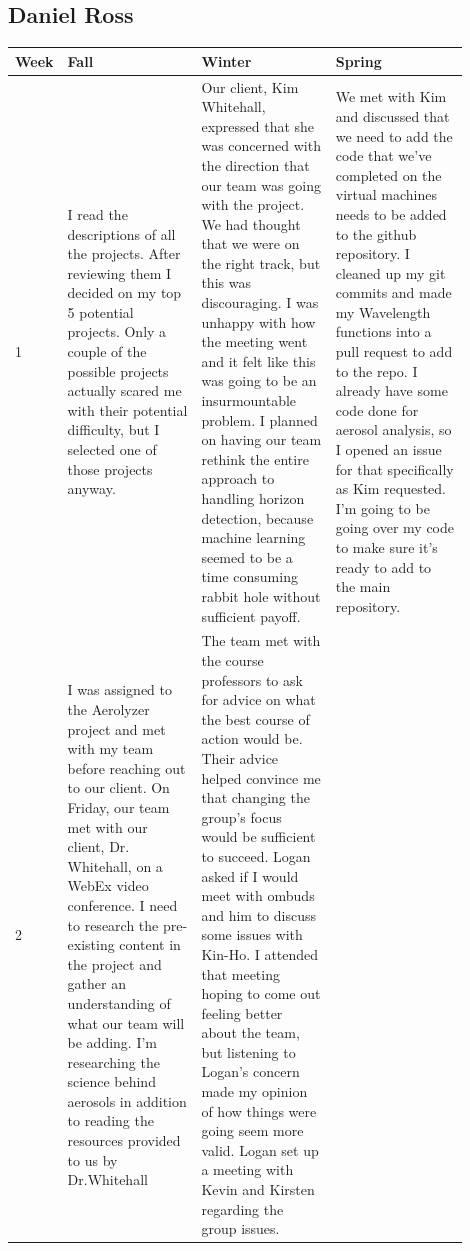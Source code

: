 \documentclass[onecolumn, draftclsnofoot,10pt, compsoc]{IEEEtran}
\begin{document}
\begin{singlespace}
		\subsection{Daniel Ross}
			\begin{longtable}{|l|p{0.3\linewidth}|p{0.3\linewidth}|p{0.3\linewidth}|}\hline \textbf{Week} & \textbf{Fall} & \textbf{Winter} & \textbf{Spring}\\\hline
			1 
			& I read the descriptions of all the projects.
			After reviewing them I decided on my top 5 potential projects.
			Only a couple of the possible projects actually scared me with their potential difficulty, but I selected one of those projects anyway.
			& Our client, Kim Whitehall, expressed that she was concerned with the direction that our team was going with the project.
			We had thought that we were on the right track, but this was discouraging.
			I was unhappy with how the meeting went and it felt like this was going to be an insurmountable problem.
			I planned on having our team rethink the entire approach to handling horizon detection, because machine learning seemed to be a time consuming rabbit hole without sufficient payoff.
			& We met with Kim and discussed that we need to add the code that we've completed on the virtual machines needs to be added to the github repository.
			I cleaned up my git commits and made my Wavelength functions into a pull request to add to the repo.
			I already have some code done for aerosol analysis, so I opened an issue for that specifically as Kim requested.
			I'm going to be going over my code to make sure it's ready to add to the main repository.
			\\\hline
			2 
			&I was assigned to the Aerolyzer project and met with my team before reaching out to our client.
			On Friday, our team met with our client, Dr. Whitehall, on a WebEx video conference.
			I need to research the pre-existing content in the project and gather an understanding of what our team will be adding.
			I'm researching the science behind aerosols in addition to reading the resources provided to us by Dr.Whitehall
			&The team met with the course professors to ask for advice on what the best course of action would be.
			Their advice helped convince me that changing the group's focus would be sufficient to succeed.
			Logan asked if I would meet with ombuds and him to discuss some issues with Kin-Ho.
			I attended that meeting hoping to come out feeling better about the team, but listening to Logan's concern made my opinion of how things were going seem more valid.
			Logan set up a meeting with Kevin and Kirsten regarding the group issues.

\end{longtable}
\end{singlespace}
\end{document}
